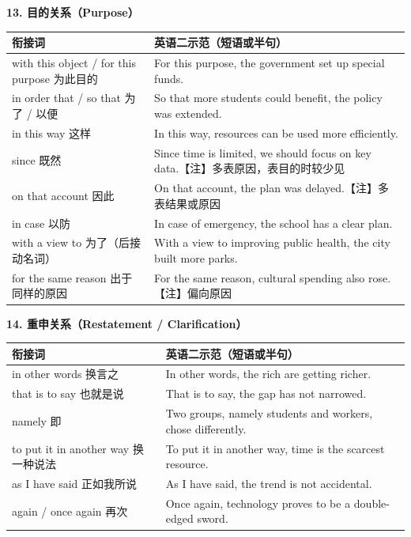 \documentclass[11pt,a4paper]{ctexart}
\begin{document}
\par\addvspace{6pt}\noindent\textbf{13. 目的关系（Purpose）}\par\addvspace{2pt}
\begin{longtable}{L{5.4cm}L{10.6cm}}
\toprule
\textbf{衔接词} & \textbf{英语二示范（短语或半句）} \\
\midrule
\endhead
with this object / for this purpose 为此目的 & For this purpose, the government set up special funds. \\
in order that / so that 为了 / 以便 & So that more students could benefit, the policy was extended. \\
in this way 这样 & In this way, resources can be used more efficiently. \\
since 既然 & Since time is limited, we should focus on key data.【注】多表原因，表目的时较少见 \\
on that account 因此 & On that account, the plan was delayed.【注】多表结果或原因 \\
in case 以防 & In case of emergency, the school has a clear plan. \\
with a view to 为了（后接动名词） & With a view to improving public health, the city built more parks. \\
for the same reason 出于同样的原因 & For the same reason, cultural spending also rose.【注】偏向原因 \\
\bottomrule
\end{longtable}

\par\addvspace{6pt}\noindent\textbf{14. 重申关系（Restatement / Clarification）}\par\addvspace{2pt}
\begin{longtable}{L{5.4cm}L{10.6cm}}
\toprule
\textbf{衔接词} & \textbf{英语二示范（短语或半句）} \\
\midrule
\endhead
in other words 换言之 & In other words, the rich are getting richer. \\
that is to say 也就是说 & That is to say, the gap has not narrowed. \\
namely 即 & Two groups, namely students and workers, chose differently. \\
to put it in another way 换一种说法 & To put it in another way, time is the scarcest resource. \\
as I have said 正如我所说 & As I have said, the trend is not accidental. \\
again / once again 再次 & Once again, technology proves to be a double-edged sword. \\
\bottomrule
\end{longtable}
\end{document}
